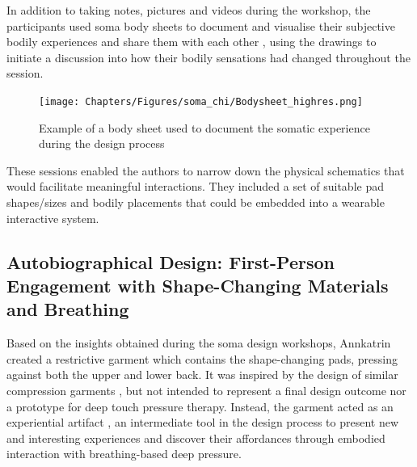 In addition to taking notes, pictures and videos during the workshop, the participants used soma body sheets to document and visualise their subjective bodily experiences and share them with each other \cite{candy_intimate_2014}, using the drawings to initiate a discussion into how their bodily sensations had changed throughout the session.

  \begin{figure}[b]
  \centering  
  \texttt{[image: Chapters/Figures/soma\_chi/Bodysheet\_highres.png]}
  \caption{Example of a body sheet used to document the somatic experience during the design process}
  \label{fig:bodysheets}
\end{figure}

These sessions enabled the authors to narrow down the physical schematics that would facilitate meaningful interactions. They included a set of suitable pad shapes/sizes and bodily placements that could be embedded into a wearable interactive system.

\subsection{Autobiographical Design: First-Person Engagement with Shape-Changing Materials and Breathing}
\label{sec:first_person_engagement}

Based on the insights obtained during the soma design workshops, Annkatrin created a restrictive garment which contains the shape-changing pads, pressing against both the upper and lower back. It was inspired by the design of similar compression garments \cite{vaucelle_design_2009, foo_user_2019}, but not intended to represent a final design outcome nor a prototype for deep touch pressure therapy. Instead, the garment acted as an experiential artifact \cite{sundstrom_experiential_2011}, an intermediate tool in the design process to present new and interesting experiences and discover their affordances through embodied interaction with breathing-based deep pressure.

